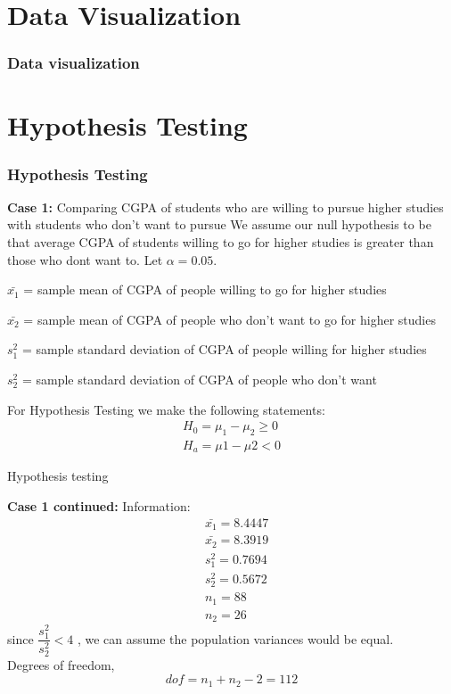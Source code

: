 \documentclass{beamer}
\begin{document}
\section{Data Visualization}
\begin{frame}
  \frametitle{Data visualization}
  
\end{frame}

\section{Hypothesis Testing}
\begin{frame}
  \frametitle{Hypothesis Testing}
  \begin{block}{\textbf{Case 1:}{ Comparing CGPA of students who are willing to pursue higher studies with students who don't want to pursue  }}
     We assume our null hypothesis to be that average CGPA of students willing to go for higher studies is  greater than those who dont want to. Let $\alpha = 0.05$.
     \begin{enumerate*}
         \item  $\bar{x_1}$ = sample mean of CGPA of people willing to go for higher studies\\
         \item  $\bar{x_2}$ = sample mean of CGPA of people who  don't want to go for higher studies\\
         \item  $s^2_1$ = sample standard deviation of CGPA of people willing for higher studies\\
         \item  $s^2_2$ = sample standard deviation of CGPA of people who  don't want \\
     \end{enumerate*}
   For Hypothesis Testing we make the following statements:
      \begin{align*}
          H_0=\mu_1-\mu_2\geq0\\
          H_a=\mu1-\mu2<0
      \end{align*}
        \end{block}
    \end{frame}
    \begin{frame}{Hypothesis testing}
        \begin{block}{\textbf{Case 1 continued:}}
            Information:
             \begin{align}
                 &\bar{x_1}=8.4447\\
                 &\bar{x_2}=8.3919\\
                 &s^2_1=0.7694\\
                 &s^2_2=0.5672\\
                 &n_1=88\\
                 &n_2=26
             \end{align}
       since $\dfrac{s^2_1}{s^2_2}<4$ , we can assume the population variances would be equal. \\
       Degrees of freedom, $$dof=n_1+n_2-2=112$$
        \end{block}
    \end{frame}
\end{document}
